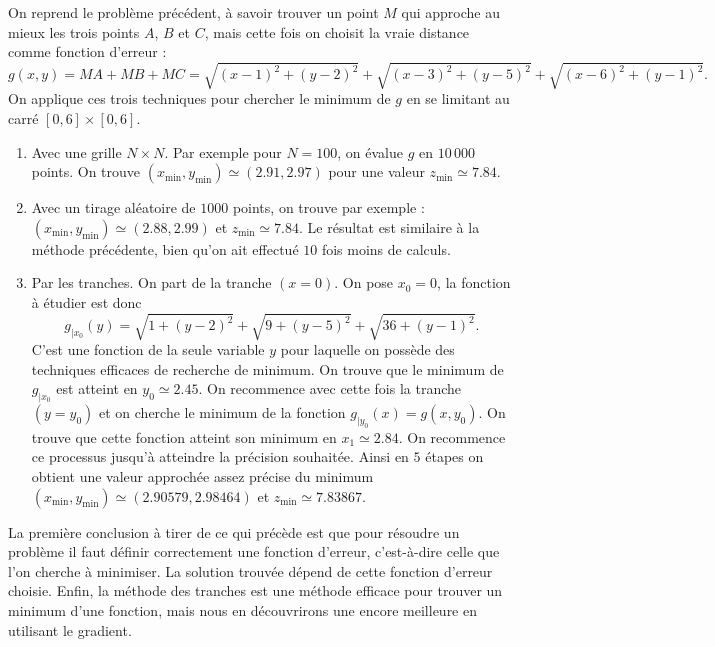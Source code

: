 \begin{exemple}{}{}
	On reprend le problème précédent, à savoir trouver un point $M$ qui approche au mieux les trois points $A$, $B$ et $C$, mais cette fois on choisit la \og{}vraie\fg{} distance comme fonction d'erreur :
	$$g(x,y) = MA+MB+MC = 
	\sqrt{(x-1)^2+ (y-2)^2} + \sqrt{(x-3)^2 + (y-5)^2} + \sqrt{(x-6)^2 + (y-1)^2}.$$
	On applique ces trois techniques pour chercher le minimum de $g$ en se limitant au carré $[0,6]\times[0,6]$.
	
	\begin{enumerate}
		
		\item Avec une grille $N\times N$. Par exemple pour $N=100$, on évalue $g$ en $10\,000$ points. On trouve $(x_{\min},y_{\min}) \simeq (2.91,2.97)$ pour une valeur $z_{\min} \simeq 7.84$. 
		
		\item Avec un tirage aléatoire de $1000$ points, on trouve par exemple :
		$(x_{\min},y_{\min}) \simeq (2.88,2.99)$ et $z_{\min} \simeq 7.84$. Le résultat est similaire à la méthode précédente, bien qu'on ait effectué $10$ fois moins de calculs.
		
		\item Par les tranches. On part de la tranche $(x=0)$. On pose $x_0=0$, la fonction à étudier
		est donc 
		$$g_{|x_0}(y) = \sqrt{1 + (y-2)^2} + \sqrt{9 + (y-5)^2} + \sqrt{36 + (y-1)^2}.$$
		C'est une fonction de la seule variable $y$ pour laquelle on possède des techniques efficaces de recherche de minimum.
		On trouve que le minimum de $g_{|x_0}$ est atteint en $y_0 \simeq 2.45$.
		On recommence avec cette fois la tranche $(y = y_0)$ et on cherche le minimum de la fonction $g_{|y_0}(x) = g(x,y_0)$. On trouve que cette fonction atteint son minimum en $x_1 \simeq 2.84$. 
		On recommence ce processus jusqu'à atteindre la précision souhaitée.
		Ainsi en $5$ étapes on obtient une valeur approchée assez précise du minimum 
		$(x_{\min},y_{\min}) \simeq (2.90579,2.98464)$ et $z_{\min} \simeq 7.83867$.
		
		
	\end{enumerate}
\end{exemple}

La première conclusion à tirer de ce qui précède est que pour résoudre un problème il faut définir correctement une fonction d'erreur, c'est-à-dire celle que l'on cherche à minimiser. La solution trouvée dépend de cette fonction d'erreur choisie. 
Enfin, la méthode des tranches est une méthode efficace pour trouver un minimum d'une fonction, mais nous en découvrirons une encore meilleure en utilisant le gradient.


